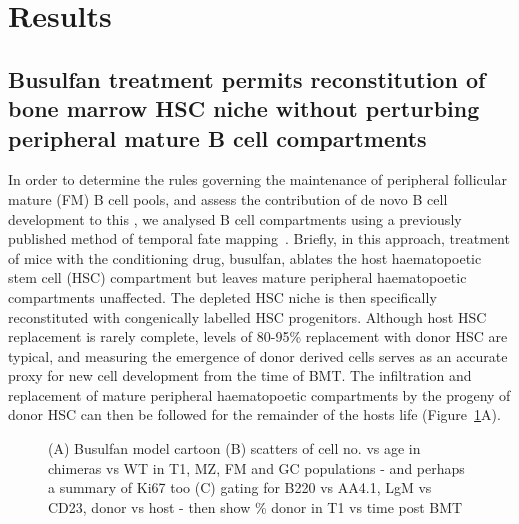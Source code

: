 \documentclass[12pt]{article}
\newcommand{\red}[1]{{\color{red}{#1}}}
\begin{document}
\clearpage
\section*{Results}
\subsection*{Busulfan treatment permits reconstitution of bone marrow HSC niche without perturbing peripheral mature B cell compartments}
In order to determine the rules governing the maintenance of peripheral follicular mature (FM) B cell pools, and assess the contribution of de novo B cell development to this , we analysed B cell compartments using a previously published method of temporal fate mapping~\citep{Hogan:2015bd}. Briefly, in this approach, treatment of mice with the conditioning drug, busulfan, ablates the host haematopoetic stem cell (HSC) compartment but leaves mature peripheral haematopoetic compartments unaffected. The depleted HSC niche is then specifically reconstituted with congenically labelled HSC progenitors. Although host HSC replacement is rarely complete, levels of 80-95\% replacement with donor  HSC are typical, and measuring the emergence of donor derived cells serves as an accurate proxy for new cell development from the time of BMT. \red{Do we need to say this? i feel it makes us look more approximate than we are... as long as we normalise to the BM or transitionals, it doesn't matter what chimerism we achieve!}  The infiltration and replacement of mature peripheral haematopoetic compartments by the progeny of donor HSC can then be followed for the remainder of the hosts life (Figure~\ref{fig:Model_validation}A). 

\begin{figure}[htbp] %
   \centering
   \caption{(A) Busulfan model cartoon (B) scatters of cell no. vs age in chimeras vs WT in T1, MZ, FM and GC populations - and perhaps a summary of Ki67 too (C) gating for B220 vs AA4.1, LgM vs CD23, donor vs host - then show \% donor in T1 vs time post BMT }
   \label{fig:Model_validation}
\end{figure}
\end{document}
